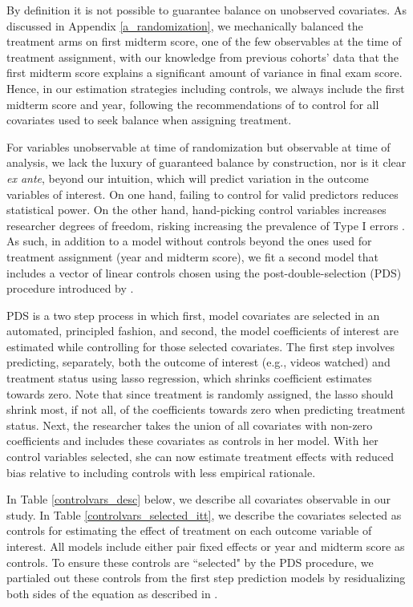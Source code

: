 \documentclass[12pt]{article}
\begin{document}
By definition it is not possible to guarantee balance on unobserved covariates. As discussed in Appendix \ref{a_randomization}, we mechanically balanced the treatment arms on first midterm score, one of the few observables at the time of treatment assignment, with our knowledge from previous cohorts' data that the first midterm score explains a significant amount of variance in final exam score. Hence, in our estimation strategies including controls, we always include the first midterm score and year, following the recommendations of \textcite{bm2009} to control for all covariates used to seek balance when assigning treatment.

For variables unobservable at time of randomization but observable at time of analysis, we lack the luxury of guaranteed balance by construction, nor is it clear \textit{ex ante}, beyond our intuition, which will predict variation in the outcome variables of interest. On one hand, failing to control for valid predictors reduces statistical power. On the other hand, hand-picking control variables increases researcher degrees of freedom, risking increasing the prevalence of Type I errors \parencite{sns2011}. As such, in addition to a model without controls beyond the ones used for treatment assignment (year and midterm score), we fit a second model that includes a vector of linear controls chosen using the post-double-selection (PDS) procedure introduced by \textcite{bch2014a}.

PDS is a two step process in which first, model covariates are selected in an automated, principled fashion, and second, the model coefficients of interest are estimated while controlling for those selected covariates. The first step involves predicting, separately, both the outcome of interest (e.g., videos watched) and treatment status using lasso regression, which shrinks coefficient estimates towards zero. Note that since treatment is randomly assigned, the lasso should shrink most, if not all, of the coefficients towards zero when predicting treatment status. Next, the researcher takes the union of all covariates with non-zero coefficients and includes these covariates as controls in her model. With her control variables selected, she can now estimate treatment effects with reduced bias relative to including controls with less empirical rationale.

In Table \ref{controlvars_desc} below, we describe all covariates observable in our study. In Table \ref{controlvars_selected_itt}, we describe the covariates selected as controls for estimating the effect of treatment on each outcome variable of interest. All models include either pair fixed effects or year and midterm score as controls. To ensure these controls are ``selected" by the PDS procedure, we partialed out these controls from the first step prediction models by residualizing both sides of the equation as described in \textcite{bch2014b}.
\end{document}
